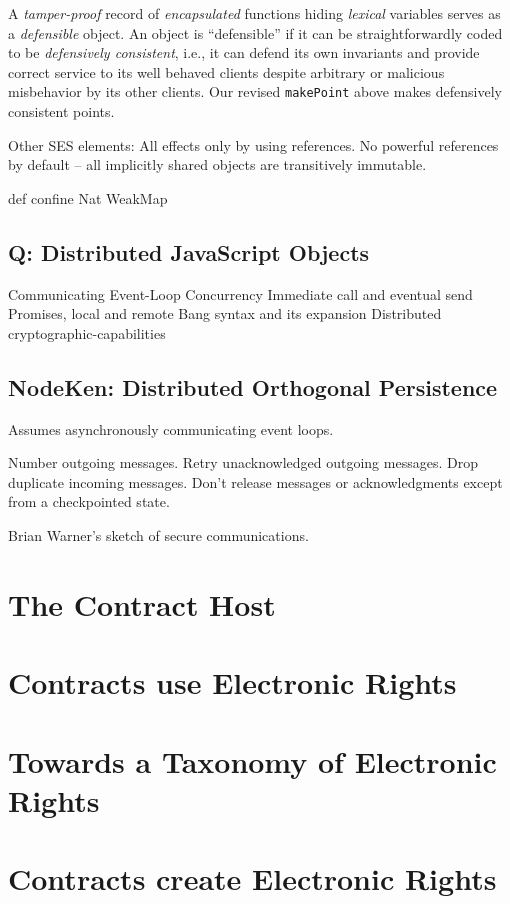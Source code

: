\documentclass{llncs}
\begin{document}
A \emph{tamper-proof} record of \emph{encapsulated} functions hiding \emph{lexical} variables serves as a \emph{defensible} object. An object is ``defensible'' if it can be straightforwardly coded to be \emph{defensively consistent}\cite{markm:thesis}, i.e., it can defend its own invariants and provide correct service to its well behaved clients despite arbitrary or malicious misbehavior by its other clients. Our revised {\tt makePoint} above makes defensively consistent points.

Other SES elements: 
All effects only by using references.
No powerful references by default -- all implicitly shared objects are transitively immutable. 

def
confine
Nat
WeakMap

\subsection{Q: Distributed JavaScript Objects}

Communicating Event-Loop Concurrency
Immediate call and eventual send
Promises, local and remote
Bang syntax and its expansion
Distributed cryptographic-capabilities

\subsection{NodeKen: Distributed Orthogonal Persistence}

Assumes asynchronously communicating event loops.

Number outgoing messages.
Retry unacknowledged outgoing messages.
Drop duplicate incoming messages.
Don't release messages or acknowledgments except from a checkpointed state.

Brian Warner's sketch of secure communications.

\section{The Contract Host}
\section{Contracts use Electronic Rights}
\section{Towards a Taxonomy of Electronic Rights}
\section{Contracts create Electronic Rights}
\end{document}
